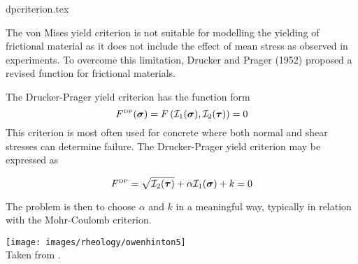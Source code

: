 \begin{flushright} {\tiny {\color{gray} dpcriterion.tex}} \end{flushright}

The von Mises yield criterion is not suitable for modelling the yielding of frictional material 
as it does not include the effect of mean stress as observed in experiments. To overcome this 
limitation, Drucker and Prager (1952) \cite{drpr52} proposed a revised function for frictional materials.

The Drucker-Prager yield criterion has the function form
\begin{equation}
F^{\text{\tiny DP}}({\bm \sigma})=F \left( {\cal I}_1({\bm \sigma}), {\cal I}_2({\bm \tau}) \right) = 0 
\end{equation}
This criterion is most often used for concrete where both normal and shear stresses 
can determine failure. The Drucker-Prager yield criterion may be expressed as
\begin{mdframed}[backgroundcolor=blue!5]
\begin{equation}
F^{\text{\tiny DP}}= \sqrt{{\cal I}_2({\bm \tau})} + \alpha {\cal I}_1({\bm \sigma}) + k =0  
\label{dpcriterion} 
\end{equation}
\end{mdframed}

The problem is then to choose $\alpha$ and $k$ in a meaningful way, typically in relation with the 
Mohr-Coulomb criterion.

\begin{center}
\texttt{[image: images/rheology/owenhinton5]}\\
{\captionfont Taken from \textcite{owhi}.}
\end{center}

